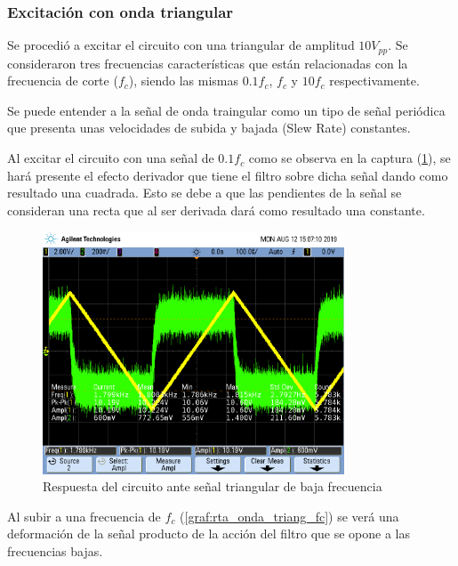 \documentclass[11pt, a4paper]{article}
\begin{document}
\subsubsection*{Excitación con onda triangular}

Se procedió a excitar el circuito con una triangular de amplitud $10 V_{pp}$. Se consideraron tres frecuencias características que están relacionadas con la frecuencia de corte ($f_c$), siendo las mismas $0.1f_c$, $f_c$ y $10f_c$ respectivamente. \par 

Se puede entender a la señal de onda traingular como un tipo de señal periódica que presenta unas velocidades de subida y bajada (Slew Rate) constantes. \par Al excitar el circuito con una señal de $0.1f_c$ como se observa en la captura (\ref{graf:rta_onda_triang_baja_f}), se hará presente el efecto derivador que tiene el filtro sobre dicha señal dando como resultado una cuadrada. Esto se debe a que las pendientes de la señal se consideran una recta que al ser derivada dará como resultado una constante.   

\begin{figure}[H]
	\centering
	\includegraphics[width=0.8\textwidth,trim={0.5cm 5cm  1 5cm},clip]{rta_onda_triang_baja_f.png}
	\caption{Respuesta del circuito ante señal triangular de baja frecuencia} 
	\label{graf:rta_onda_triang_baja_f}
\end{figure}

Al subir a una frecuencia de $f_c$ (\ref{graf:rta_onda_triang_fc}) se verá una deformación de la señal producto de la acción del filtro que se opone a las frecuencias bajas.
\end{document}
